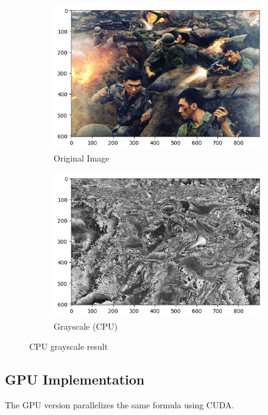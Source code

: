 \documentclass[hidelinks,12pt,a4paper]{article}
\begin{document}
\begin{figure}[H]
  \centering
  \begin{subfigure}[b]{0.45\textwidth}
    \includegraphics[width=\linewidth]{images/Original Image.png}
    \caption{Original Image}
  \end{subfigure}
  \hfill
  \begin{subfigure}[b]{0.45\textwidth}
    \includegraphics[width=\linewidth]{images/gray_cpu.png}
    \caption{Grayscale (CPU)}
  \end{subfigure}
  \caption{CPU grayscale result}
\end{figure}

\subsection{GPU Implementation}
The GPU version parallelizes the same formula using CUDA.
\end{document}

